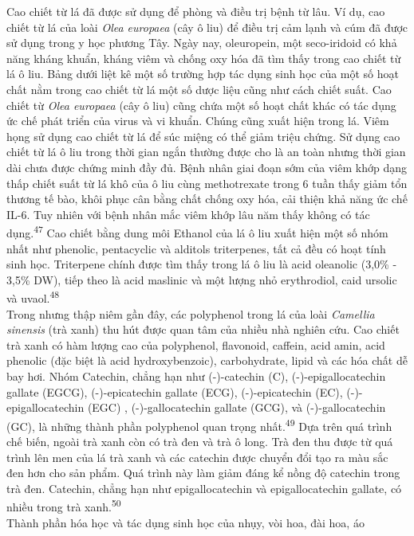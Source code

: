 \documentclass[
  letterpaper,
  DIV=11,
  numbers=noendperiod]{scrartcl}
\begin{document}
Cao chiết từ lá đã được sử dụng để phòng và điều trị bệnh từ lâu. Ví dụ,
cao chiết từ lá của loài \emph{Olea europaea} (cây ô liu) để điều trị
cảm lạnh và cúm đã được sử dụng trong y học phương Tây. Ngày nay,
oleuropein, một seco-iridoid có khả năng kháng khuẩn, kháng viêm và
chống oxy hóa đã tìm thấy trong cao chiết từ lá ô liu. Bảng dưới liệt kê
một số trường hợp tác dụng sinh học của một số hoạt chất nằm trong cao
chiết từ lá một số dược liệu cũng như cách chiết suất. Cao chiết từ
\emph{Olea europaea} (cây ô liu) cũng chứa một số hoạt chất khác có tác
dụng ức chế phát triển của virus và vi khuẩn. Chúng cũng xuất hiện trong
lá. Viêm họng sử dụng cao chiết từ lá để súc miệng có thể giảm triệu
chứng. Sử dụng cao chiết từ lá ô liu trong thời gian ngắn thường được
cho là an toàn nhưng thời gian dài chưa được chứng minh đầy đủ. Bệnh
nhân giai đoạn sớm của viêm khớp dạng thấp chiết suất từ lá khô của ô
liu cùng methotrexate trong 6 tuần thấy giảm tổn thương tế bào, khôi
phục cân bằng chất chống oxy hóa, cải thiện khả năng ức chế IL-6. Tuy
nhiên với bệnh nhân mắc viêm khớp lâu năm thấy không có tác
dụng.\textsuperscript{47} Cao chiết bằng dung môi Ethanol của lá ô liu
xuất hiện một số nhóm nhất như phenolic, pentacyclic và alditols
triterpenes, tất cả đều có hoạt tính sinh học. Triterpene chính được tìm
thấy trong lá ô liu là acid oleanolic (3,0\% - 3,5\% DW), tiếp theo là
acid maslinic và một lượng nhỏ erythrodiol, caid ursolic và
uvaol.\textsuperscript{48}\\
Trong nhưng thập niêm gần đây, các polyphenol trong lá của loài
\emph{Camellia sinensis} (trà xanh) thu hút được quan tâm của nhiều nhà
nghiên cứu. Cao chiết trà xanh có hàm lượng cao của polyphenol,
flavonoid, caffein, acid amin, acid phenolic (đặc biệt là acid
hydroxybenzoic), carbohydrate, lipid và các hóa chất dễ bay hơi. Nhóm
Catechin, chẳng hạn như (-)-catechin (C), (-)-epigallocatechin gallate
(EGCG), (-)-epicatechin gallate (ECG), (-)-epicatechin (EC),
(-)-epigallocatechin (EGC) , (-)-gallocatechin gallate (GCG), và
(-)-gallocatechin (GC), là những thành phần polyphenol quan trọng
nhất.\textsuperscript{49} Dựa trên quá trình chế biến, ngoài trà xanh
còn có trà đen và trà ô long. Trà đen thu được từ quá trình lên men của
lá trà xanh và các catechin được chuyển đổi tạo ra màu sắc đen hơn cho
sản phẩm. Quá trình này làm giảm đáng kể nồng độ catechin trong trà đen.
Catechin, chẳng hạn như epigallocatechin và epigallocatechin gallate, có
nhiều trong trà xanh.\textsuperscript{50}\\
Thành phần hóa học và tác dụng sinh học của nhụy, vòi hoa, đài hoa, áo
\end{document}
